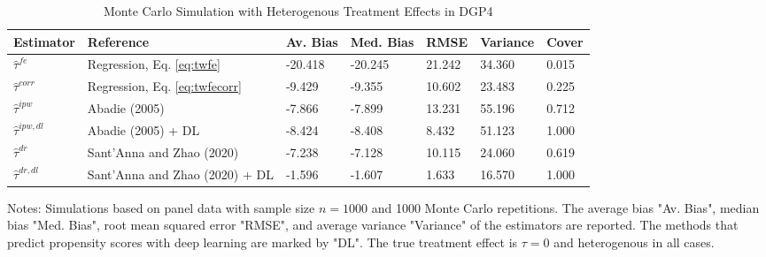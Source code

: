 \begin{table}[]
\centering
\begin{threeparttable}
\caption{Monte Carlo Simulation with Heterogenous Treatment Effects in DGP4}
\label{tab:table2}
\begin{tabular}{lllllll}
\toprule
\hline
\addlinespace
Estimator         & Reference                         & Av. Bias   & Med. Bias   & RMSE & Variance & Cover \\ \midrule
\addlinespace
$\hat{\tau}^{fe}$ & Regression, Eq. \eqref{eq:twfe}               & -20.418      & -20.245        & 21.242 & 34.360  &0.015   \\
$\hat{\tau}^{corr}$ & Regression, Eq. \eqref{eq:twfecorr}           & -9.429      & -9.355       & 10.602 & 23.483  &0.225  \\
$\hat{\tau}^{ipw}$ & Abadie (2005)                    & -7.866       & -7.899       & 13.231 & 55.196   &0.712  \\
$\hat{\tau}^{ipw,dl}$ & Abadie (2005) + DL            & -8.424       & -8.408        & 8.432 & 51.123   &1.000   \\
$\hat{\tau}^{dr}$ & Sant'Anna and Zhao (2020)         & -7.238      & -7.128        & 10.115 & 24.060   & 0.619   \\
$\hat{\tau}^{dr,dl}$ & Sant'Anna and Zhao (2020) + DL & -1.596       & -1.607        & 1.633 & 16.570   & 1.000  \\

\bottomrule
\end{tabular}
\begin{tablenotes}
    \item Notes: Simulations based on panel data with sample size $n = 1000$ and 1000 Monte Carlo repetitions. The average bias "Av. Bias", median bias "Med. Bias", root mean squared error "RMSE", and average variance "Variance" of the estimators are reported. The methods that predict propensity scores with deep learning are marked by "DL". The true treatment effect is $\tau = 0$ and heterogenous in all cases.
\end{tablenotes}
\end{threeparttable}
\end{table}
